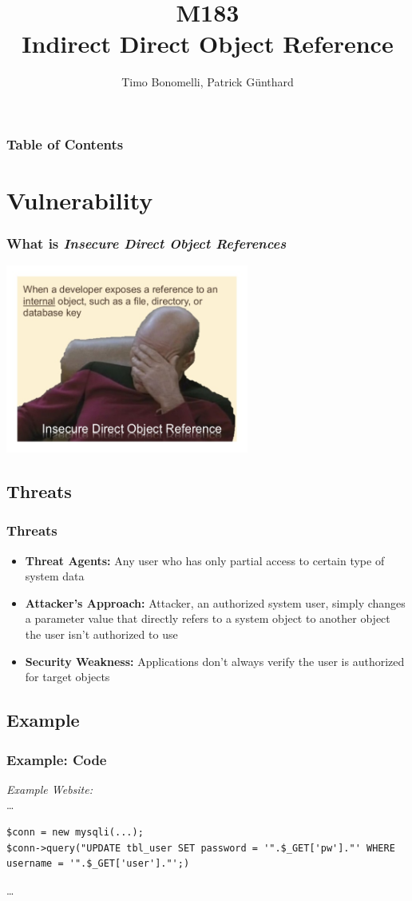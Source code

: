 \documentclass[aspectratio=169]{beamer}
\title{\textbf{M183} \\Indirect Direct Object Reference}
\author{Timo Bonomelli, Patrick Günthard}
\begin{document}
\frame{\titlepage}

\begin{frame}
  \frametitle{Table of Contents}
  \tableofcontents
\end{frame}
\section{Vulnerability}

\begin{frame}
  \frametitle{What is \textit{Insecure Direct Object References}}
  \includegraphics[width=8cm]{meme}
\end{frame}

\subsection{Threats}

\begin{frame}
  \frametitle{Threats}
  \begin{itemize}
  \item \textbf{Threat Agents:} Any user who has only partial access to certain type of system data
  \item \textbf{Attacker’s Approach:} Attacker, an authorized system user, simply changes a parameter value that directly refers to a system object to another object the user isn’t authorized to use
  \item \textbf{Security Weakness:} Applications don’t always verify the user is authorized for target objects
  \end{itemize}
\end{frame}

\subsection{Example}

\begin{frame}[fragile]
  \label{examplecode}
  \frametitle{Example: Code}
  \textit{Example Website:}\\\tiny
\dots
\begin{verbatim}
$conn = new mysqli(...);
$conn->query("UPDATE tbl_user SET password = '".$_GET['pw']."' WHERE username = '".$_GET['user']."';)
\end{verbatim}
\dots
\normalsize
\end{frame}
\end{document}
